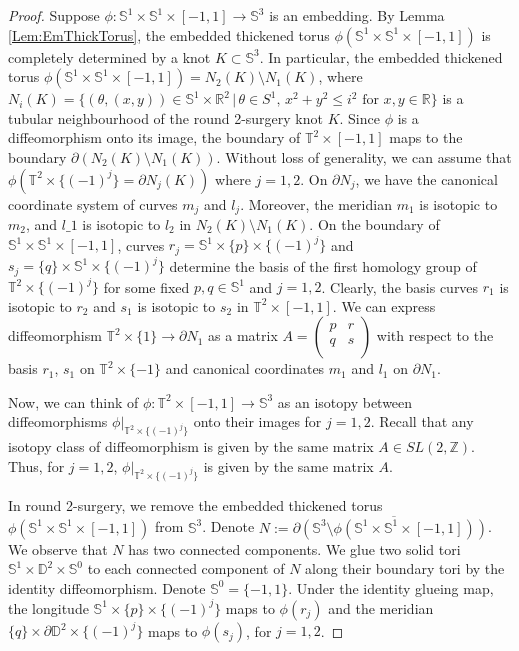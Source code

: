 \documentclass{amsart}
\theoremstyle{plain}
\theoremstyle{remark}
\theoremstyle{definition}
\newcommand{\R}{\mathbb{R}}
\newcommand{\s}{\mathbb{S}}
\newcommand{\D}{\mathbb{D}}
\newcommand{\dd}{\partial}
\begin{document}
\begin{proof}
Suppose $\phi : \s^1 \times \s^1 \times [-1,1] \to \s^3$ is an embedding. 
By Lemma \ref{Lem:EmThickTorus}, the embedded thickened torus $\phi(\s^1 \times \s^1 \times [-1,1])$ is completely determined by a knot $K \subset \mathbb{S}^3$.
In particular, the embedded thickened torus $\phi(\s^1 \times \s^1 \times [-1,1]) = N_2 (K) \setminus N_1(K)$, where $N_i(K)=\{(\theta, (x,y)) \in \s^1 \times \R^2 \, |\,  \theta \in S^1, \,  x^2 + y^2\leq i^2 \text{ for }x, y \in \mathbb{R}\}$ is a tubular neighbourhood of the round 2-surgery knot $K$. 
Since $\phi$ is a diffeomorphism onto its image, the boundary of $\mathbb{T}^2 \times [-1,1]$ maps to the boundary $\dd (N_2(K)\setminus N_1(K))$. Without loss of generality, we can assume that $\phi\left(\mathbb{T}^2 \times \{(-1)^j\} = \dd N_j(K)\right)$ where $j=1,2$. 
On $\dd N_j$, we have the canonical coordinate system of curves $m_j$ and $l_j$. 
Moreover, the meridian $m_1$ is isotopic to $m_2$, and $l\_1$ is isotopic to $l_2$ in $N_2(K)\setminus N_1(K)$.
On the boundary of $\s^1 \times \s^1 \times [-1,1]$, curves $r_{j}=\s^1\times \{p\} \times \{(-1)^j\} $ and $s_{j} = \{q\}  \times \s^1\times \{(-1)^j\}$ determine the basis of the first homology group of $\mathbb{T}^2 \times \{(-1)^j\}$ for some fixed $p, q \in \s^1$ and $j=1,2$.
Clearly, the basis curves $r_1$ is isotopic to $r_2$ and $s_1$ is isotopic to $s_2$ in $\mathbb{T}^2 \times [-1,1]$. 
We can express diffeomorphism $\mathbb{T}^2 \times \{1\} \to \dd N_{1}$ as a matrix $A= \begin{pmatrix}
    p & r\\
    q & s\\
\end{pmatrix}$ with respect to the basis $r_1$, $s_1$ on $\mathbb{T}^2 \times \{-1\}$ and canonical coordinates $m_1$ and $l_1$ on $\dd N_1$. 

Now, we can think of $\phi: \mathbb{T}^2 \times [-1,1] \to \s^3$ as an isotopy between diffeomorphisms $\phi|_{\mathbb{T}^2 \times \{(-1)^j\}}$ onto their images for $j=1,2$. 
Recall that any isotopy class of diffeomorphism is given by the same matrix $A \in SL(2, \mathbb{Z})$.
Thus, for $j=1,2$, $\phi|_{\mathbb{T}^2 \times \{(-1)^j\}}$ is given by the same matrix $A$.

In round 2-surgery, we remove the embedded thickened torus $\phi(\s^1 \times \s^1 \times [-1,1])$ from $\mathbb{S}^3$. 
Denote $N :=\partial \overline{(\s^3\setminus \phi(\s^1 \times \s^1 \times [-1,1]))}$.
We observe that $N$ has two connected components. 
We glue two solid tori $\s^1 \times \D^2 \times \s^0 $ to each connected component of $N$ along their boundary tori by the identity diffeomorphism.
Denote $\s^0 =\{-1,1\}$. Under the identity glueing map, 
the longitude $\s^1 \times \{p\} \times \{(-1)^j\}$ maps to $\phi(r_j)$ and the meridian $\{q\} \times \dd \D^2 \times \{(-1)^j\}$ maps to $\phi(s_j)$, for $j=1,2$. 


\end{proof}
\end{document}

